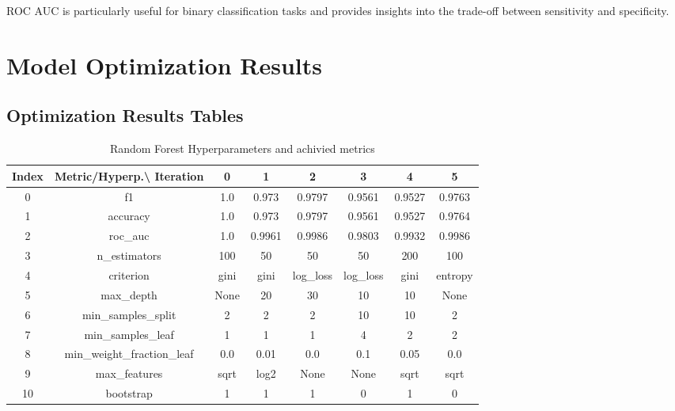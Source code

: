 \documentclass{article}%
\begin{document}
                ROC AUC is particularly useful for binary classification tasks and provides insights into the trade-off between sensitivity and specificity.
                

%
\newpage%
\section{Model Optimization Results}%
\label{sec:ModelOptimizationResults}%
\subsection{Optimization Results Tables}%
\label{subsec:OptimizationResultsTables}%


\begin{table}[h!]%
\caption{Random Forest Hyperparameters and achivied metrics}%
\vspace{0.2cm}%
\centering%
\begin{tabular}{|c||c||c||c||c||c||c||c|}%
\hline%
Index&Metric/Hyperp.\textbackslash{} Iteration&0&1&2&3&4&5\\%
\hline%
0&f1&1.0&0.973&0.9797&0.9561&0.9527&0.9763\\%
1&accuracy&1.0&0.973&0.9797&0.9561&0.9527&0.9764\\%
2&roc\_auc&1.0&0.9961&0.9986&0.9803&0.9932&0.9986\\%
3&n\_estimators&100&50&50&50&200&100\\%
4&criterion&gini&gini&log\_loss&log\_loss&gini&entropy\\%
5&max\_depth&None&20&30&10&10&None\\%
6&min\_samples\_split&2&2&2&10&10&2\\%
7&min\_samples\_leaf&1&1&1&4&2&2\\%
8&min\_weight\_fraction\_leaf&0.0&0.01&0.0&0.1&0.05&0.0\\%
9&max\_features&sqrt&log2&None&None&sqrt&sqrt\\%
10&bootstrap&1&1&1&0&1&0\\%
\hline%
\end{tabular}%
\end{table}

%
\end{document}
